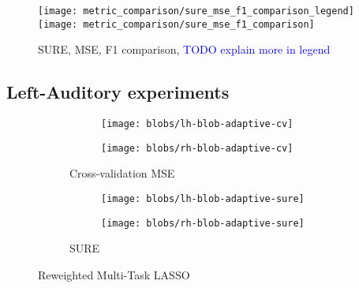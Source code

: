 \begin{figure}[h]
    \centering
    \texttt{[image: metric\_comparison/sure\_mse\_f1\_comparison\_legend]}
    \texttt{[image: metric\_comparison/sure\_mse\_f1\_comparison]}
    \caption{SURE, MSE, F1 comparison, \textcolor{blue}{TODO explain more in legend}}
    \label{fig:sure_mse_f1_comparison}
\end{figure}

\subsection{Left-Auditory experiments}

\begin{figure}[t!]
    \centering
    \begin{subfigure}[t]{0.3\textwidth}
        \centering
        \begin{subfigure}[t]{0.3\textwidth}
            \centering
            \texttt{[image: blobs/lh-blob-adaptive-cv]}
        \end{subfigure}
        \hfill
        \begin{subfigure}[t]{0.3\textwidth}
            \centering
            \texttt{[image: blobs/rh-blob-adaptive-cv]}
        \end{subfigure}
        \caption{Cross-validation MSE}
        \label{fig:blob-adaptive-cv}
    \end{subfigure}
    \vfill
    \begin{subfigure}[t]{0.3\textwidth}
        \begin{subfigure}[t]{0.3\textwidth}
            \centering
            \texttt{[image: blobs/lh-blob-adaptive-sure]}
        \end{subfigure}
        \hfill
        \begin{subfigure}[t]{0.3\textwidth}
            \centering
            \texttt{[image: blobs/rh-blob-adaptive-sure]}
        \end{subfigure}
        \caption{SURE}
        \label{fig:blob-adaptive-sure}
    \end{subfigure}
    \caption{Reweighted Multi-Task LASSO}
\end{figure}


